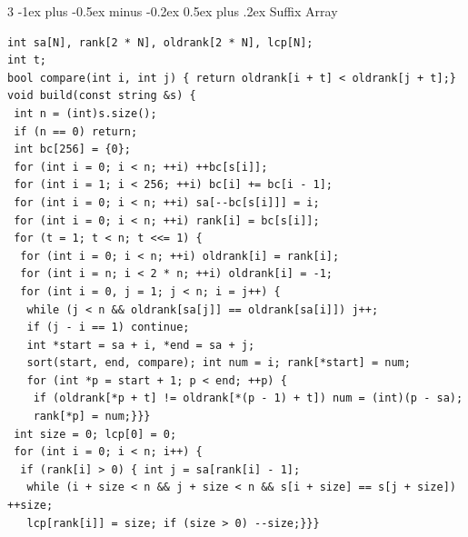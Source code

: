 \documentclass[8pt,a4paper,onesided]{article}
\makeatletter
\renewcommand{\subsection}{\@startsection{subsection}{2}{0mm}
    {-1ex plus -0.5ex minus -0.2ex} %
    {0.5ex plus .2ex}                %
    {\normalfont\large\bfseries}}    %
\makeatother
\begin{document}
\begin{multicols}{3}
\subsection{Suffix Array}
\begin{verbatim}
int sa[N], rank[2 * N], oldrank[2 * N], lcp[N];
int t;
bool compare(int i, int j) { return oldrank[i + t] < oldrank[j + t];}
void build(const string &s) {
 int n = (int)s.size();
 if (n == 0) return;
 int bc[256] = {0};
 for (int i = 0; i < n; ++i) ++bc[s[i]];
 for (int i = 1; i < 256; ++i) bc[i] += bc[i - 1];
 for (int i = 0; i < n; ++i) sa[--bc[s[i]]] = i;
 for (int i = 0; i < n; ++i) rank[i] = bc[s[i]];
 for (t = 1; t < n; t <<= 1) {
  for (int i = 0; i < n; ++i) oldrank[i] = rank[i];
  for (int i = n; i < 2 * n; ++i) oldrank[i] = -1;
  for (int i = 0, j = 1; j < n; i = j++) {
   while (j < n && oldrank[sa[j]] == oldrank[sa[i]]) j++;
   if (j - i == 1) continue;
   int *start = sa + i, *end = sa + j;
   sort(start, end, compare); int num = i; rank[*start] = num;
   for (int *p = start + 1; p < end; ++p) {
    if (oldrank[*p + t] != oldrank[*(p - 1) + t]) num = (int)(p - sa);
    rank[*p] = num;}}}
 int size = 0; lcp[0] = 0;
 for (int i = 0; i < n; i++) {
  if (rank[i] > 0) { int j = sa[rank[i] - 1];
   while (i + size < n && j + size < n && s[i + size] == s[j + size]) ++size;
   lcp[rank[i]] = size; if (size > 0) --size;}}}
\end{verbatim}

\end{multicols}
\end{document}
